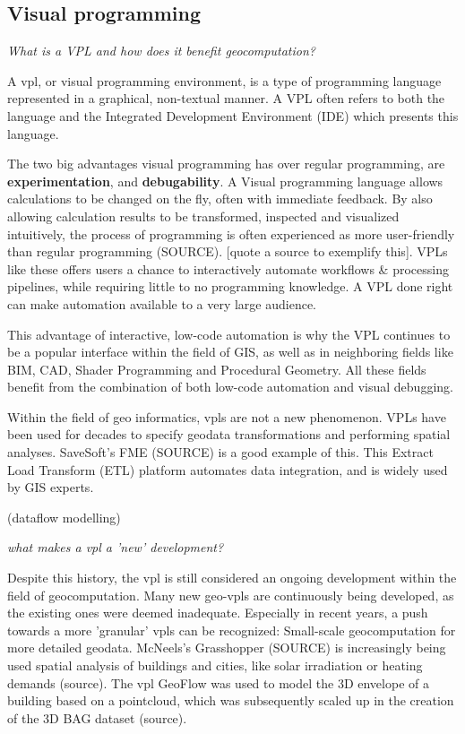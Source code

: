 \subsection*{Visual programming}

\emph{What is a VPL and how does it benefit geocomputation?}

A \ac{vpl}, or visual programming environment, is a type of programming language represented in a graphical, non-textual manner.
A VPL often refers to both the language and the Integrated Development Environment (IDE) which presents this language.

The two big advantages visual programming has over regular programming, are \textbf{experimentation}, and \textbf{debugability}.
A Visual programming language allows calculations to be changed on the fly, often with immediate feedback. By also allowing calculation results to be transformed, inspected and visualized intuitively, the process of programming is often experienced as more user-friendly than regular programming (SOURCE).
[quote a source to exemplify this].
VPLs like these offers users a chance to interactively automate workflows \& processing pipelines, while requiring little to no programming knowledge. 
A VPL done right can make automation available to a very large audience.

This advantage of interactive, low-code automation is why the VPL continues to be a popular interface within the field of GIS, as well as in neighboring fields like BIM, CAD, Shader Programming and Procedural Geometry. 
All these fields benefit from the combination of both low-code automation and visual debugging.

Within the field of geo informatics, \ac{vpl}s are not a new phenomenon. VPLs have been used for decades to specify geodata transformations and performing spatial analyses.  
SaveSoft's FME (SOURCE) is a good example of this. This Extract Load Transform (ETL) platform automates data integration, and is widely used by GIS experts.

(dataflow modelling)

\emph{what makes a vpl a 'new' development?}

Despite this history, the \ac{vpl} is still considered an ongoing development within the field of geocomputation. Many new \ac{geo-vpl}s are continuously being developed, as the existing ones were deemed inadequate. Especially in recent years, a push towards a more 'granular' \ac{vpl}s can be recognized: Small-scale geocomputation for more detailed geodata. 
McNeels's Grasshopper (SOURCE) is increasingly being used spatial analysis of buildings and cities, like solar irradiation or heating demands (source). 
The \ac{vpl} GeoFlow was used to model the 3D envelope of a building based on a pointcloud, which was subsequently scaled up in the creation of the 3D BAG dataset (source).


